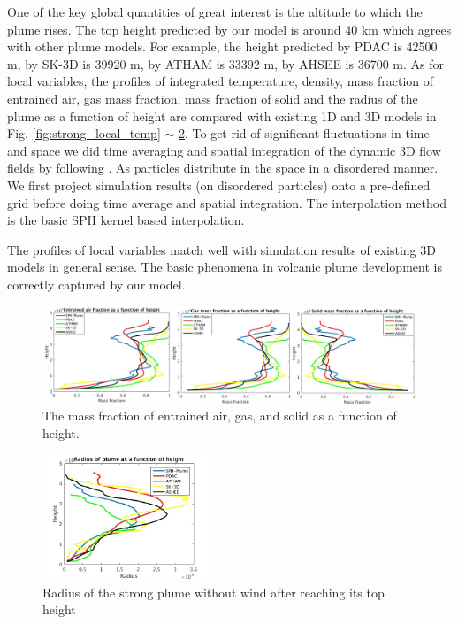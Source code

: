 \documentclass[journal abbreviation, manuscript]{copernicus}
\begin{document}
One of the key global quantities of great interest is the altitude to which the plume rises. The top height predicted by our model is around 40 km which agrees with other plume models. For example, the height predicted by PDAC is 42500 m, by SK-3D is 39920 m, by ATHAM is 33392 m, by AHSEE is 36700 m. As for local variables, the profiles of integrated temperature, density, mass fraction of entrained air, gas mass fraction, mass fraction of solid and the radius of the plume as a function of height are compared with existing 1D and 3D models in Fig. \ref{fig:strong_local_temp} $\sim$ \ref{fig:strong_local_radius}. To get rid of significant fluctuations in time and space we did time averaging and spatial integration of the dynamic 3D flow fields by following \citet {cerminara2016large}.
As particles distribute in the space in a disordered manner. We first project simulation results (on disordered particles) onto a pre-defined grid before doing time average and spatial integration. The interpolation method is the basic SPH kernel based interpolation.

The profiles of local variables match well with simulation results of existing 3D models in general sense. The basic phenomena in volcanic plume development is correctly captured by our model.

\begin{figure}
\includegraphics[width=15cm]{msfrac}
\caption{The mass fraction of entrained air, gas, and solid as a function of height.}
\label{fig:strong_plume_mass_fraction}
\end{figure}
%

\begin{figure}
\center
\includegraphics[width=5cm]{radius_strong}
\caption{Radius of the strong plume without wind after reaching its top height}
\label{fig:strong_local_radius}
\end{figure}
\end{document}

